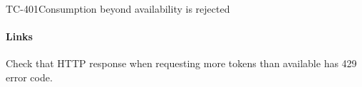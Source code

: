 \begin{testcase}{TC-401}{Consumption beyond availability is rejected}
    \paragraph{Links} 
    Check that HTTP response when requesting more tokens than available has 429 error code.
\end{testcase}

